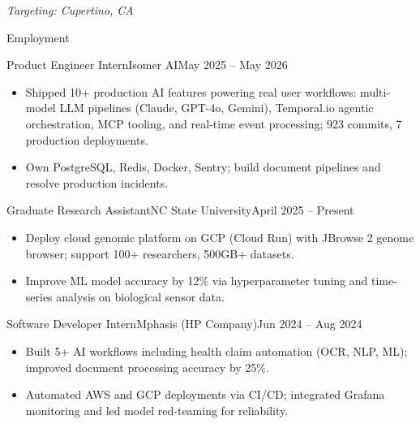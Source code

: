 \documentclass[]{mcdowellcv}
\begin{document}
\makeheader
\begin{center}\vspace{-12pt}\small\textit{Targeting: Cupertino, CA}\end{center}\vspace{-10pt}

\begin{cvsection}{Employment}
  \begin{cvsubsection}{Product Engineer Intern}{Isomer AI}{May 2025 -- May 2026}
    \begin{itemize}
      \item Shipped 10+ production AI features powering real user workflows: multi-model LLM pipelines (Claude, GPT-4o, Gemini), Temporal.io agentic orchestration, MCP tooling, and real-time event processing; 923 commits, 7 production deployments.
      \item Own PostgreSQL, Redis, Docker, Sentry; build document pipelines and resolve production incidents.
    \end{itemize}
    \vspace{-1.5pt}
  \end{cvsubsection}

  \begin{cvsubsection}{Graduate Research Assistant}{NC State University}{April 2025 -- Present}
    \begin{itemize}
      \item Deploy cloud genomic platform on GCP (Cloud Run) with JBrowse 2 genome browser; support 100+ researchers, 500GB+ datasets.
      \item Improve ML model accuracy by 12\% via hyperparameter tuning and time-series analysis on biological sensor data.
    \end{itemize}
    \vspace{-1.5pt}
  \end{cvsubsection}

  \begin{cvsubsection}{Software Developer Intern}{Mphasis (HP Company)}{Jun 2024 -- Aug 2024}
    \begin{itemize}
      \item Built 5+ AI workflows including health claim automation (OCR, NLP, ML); improved document processing accuracy by 25\%.
      \item Automated AWS and GCP deployments via CI/CD; integrated Grafana monitoring and led model red-teaming for reliability.
    \end{itemize}
    \vspace{-1.5pt}
  \end{cvsubsection}


\end{cvsection}
\end{document}
